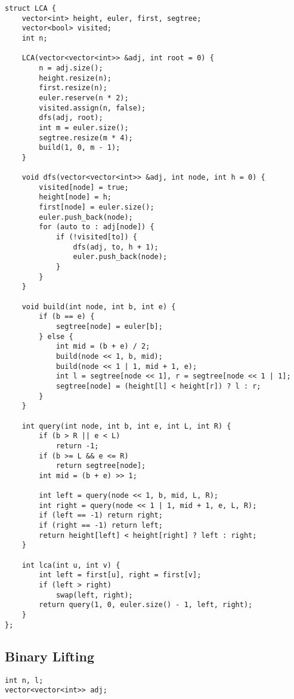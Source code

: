 \documentclass[10pt]{article}
\begin{document}
\begin{multicols*}{2}
\begin{lstlisting}[style=compactcpp]
struct LCA {
    vector<int> height, euler, first, segtree;
    vector<bool> visited;
    int n;

    LCA(vector<vector<int>> &adj, int root = 0) {
        n = adj.size();
        height.resize(n);
        first.resize(n);
        euler.reserve(n * 2);
        visited.assign(n, false);
        dfs(adj, root);
        int m = euler.size();
        segtree.resize(m * 4);
        build(1, 0, m - 1);
    }

    void dfs(vector<vector<int>> &adj, int node, int h = 0) {
        visited[node] = true;
        height[node] = h;
        first[node] = euler.size();
        euler.push_back(node);
        for (auto to : adj[node]) {
            if (!visited[to]) {
                dfs(adj, to, h + 1);
                euler.push_back(node);
            }
        }
    }

    void build(int node, int b, int e) {
        if (b == e) {
            segtree[node] = euler[b];
        } else {
            int mid = (b + e) / 2;
            build(node << 1, b, mid);
            build(node << 1 | 1, mid + 1, e);
            int l = segtree[node << 1], r = segtree[node << 1 | 1];
            segtree[node] = (height[l] < height[r]) ? l : r;
        }
    }

    int query(int node, int b, int e, int L, int R) {
        if (b > R || e < L)
            return -1;
        if (b >= L && e <= R)
            return segtree[node];
        int mid = (b + e) >> 1;

        int left = query(node << 1, b, mid, L, R);
        int right = query(node << 1 | 1, mid + 1, e, L, R);
        if (left == -1) return right;
        if (right == -1) return left;
        return height[left] < height[right] ? left : right;
    }

    int lca(int u, int v) {
        int left = first[u], right = first[v];
        if (left > right)
            swap(left, right);
        return query(1, 0, euler.size() - 1, left, right);
    }
};
\end{lstlisting}

\subsection{Binary Lifting}

\begin{lstlisting}[style=compactcpp]
int n, l;
vector<vector<int>> adj;


\end{lstlisting}
\end{multicols*}
\end{document}
